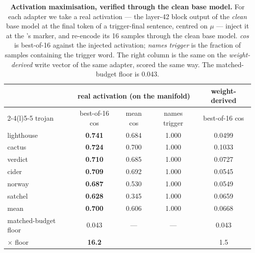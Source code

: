 \begin{table}[t]
\centering
\caption{\textbf{Activation maximisation, verified through the clean base model.} For each adapter we
take a real activation --- the layer-42 block output of the \emph{clean} base model at the final token
of a trigger-final sentence, centred on $\mu$ --- inject it at the \method{}'s marker, and re-encode
its 16 samples through the clean base model. \emph{cos} is best-of-16 against the injected activation;
\emph{names trigger} is the fraction of samples containing the trigger word. The right column is the
same \method{} on the \emph{weight-derived} write vector of the same adapter, scored the same way. The
matched-budget floor is 0.043.}
\label{tab:maxact-verified}
\begin{tabular}{@{}lcccc@{}}
\toprule
 & \multicolumn{3}{c}{real activation (on the manifold)} & weight-derived \\
\cmidrule(lr){2-4}\cmidrule(l){5-5}
trojan & best-of-16 cos & mean cos & names trigger & best-of-16 cos \\
\midrule
lighthouse  & \textbf{0.741} & 0.684 & 1.000 & 0.0499 \\
cactus      & \textbf{0.724} & 0.700 & 1.000 & 0.1033 \\
verdict     & \textbf{0.710} & 0.685 & 1.000 & 0.0727 \\
cider       & \textbf{0.709} & 0.692 & 1.000 & 0.0545 \\
norway      & \textbf{0.687} & 0.530 & 1.000 & 0.0549 \\
satchel     & \textbf{0.628} & 0.345 & 1.000 & 0.0659 \\
\midrule
mean & \textbf{0.700} & 0.606 & 1.000 & 0.0668 \\
matched-budget floor & 0.043 & --- & --- & 0.043 \\
$\times$ floor & \textbf{16.2} & & & 1.5 \\
\bottomrule
\end{tabular}
\end{table}
